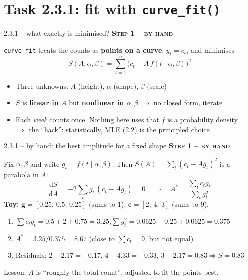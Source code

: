 \documentclass[aspectratio=169,11pt]{beamer}
\newcommand{\stage}[2]{{\color{#1}\bfseries\small\textsc{#2}}\par\smallskip}
\newcommand{\Byhand}{\stage{hand}{Step 1 -- by hand}}
\begin{document}
\section{Task 2.3.1: fit with \texttt{curve\_fit()}}

\begin{frame}{2.3.1 -- what exactly is minimised?}
\Byhand
\texttt{curve\_fit} treats the counts as \textbf{points on a curve}, $y_t=c_t$, and minimises
\[
S(A,\alpha,\beta)=\sum_{t=1}^{n}\Big(c_t-A\,f(t\mid\alpha,\beta)\Big)^2
\]
\begin{itemize}
\item Three unknowns: $A$ (height), $\alpha$ (shape), $\beta$ (scale)
\item $S$ is \textbf{linear in $A$} but \textbf{nonlinear in $\alpha,\beta$} $\Rightarrow$ no closed form, iterate
\item Each \emph{week} counts once. Nothing here uses that $f$ is a probability density\\
$\Rightarrow$ the ``hack'': statistically, MLE (2.2) is the principled choice
\end{itemize}
\end{frame}

\begin{frame}{2.3.1 -- by hand: the best amplitude for a fixed shape}\small
\Byhand
Fix $\alpha,\beta$ and write $g_t=f(t\mid\alpha,\beta)$. Then $S(A)=\sum_t(c_t-Ag_t)^2$ is a parabola in $A$:
\[
\frac{\mathrm dS}{\mathrm dA}=-2\sum_t g_t\,(c_t-Ag_t)=0
\quad\Longrightarrow\quad
A^*=\frac{\sum_t c_tg_t}{\sum_t g_t^2}
\]
\textbf{Toy:} $\bm g=[0.25,\,0.5,\,0.25]$ (sums to 1), $\bm c=[2,\,4,\,3]$ (sums to 9).
\begin{enumerate}
\item $\sum c_tg_t=0.5+2+0.75=3.25$,\quad $\sum g_t^2=0.0625+0.25+0.0625=0.375$
\item $A^*=3.25/0.375=8.67$ \quad (close to $\sum c_t=9$, but not equal)
\item Residuals: $2-2.17=-0.17$,\; $4-4.33=-0.33$,\; $3-2.17=0.83$\quad$\Rightarrow S=0.83$
\end{enumerate}
\alert{Lesson:} $A$ is ``roughly the total count'', adjusted to fit the points best.
\end{frame}
\end{document}

